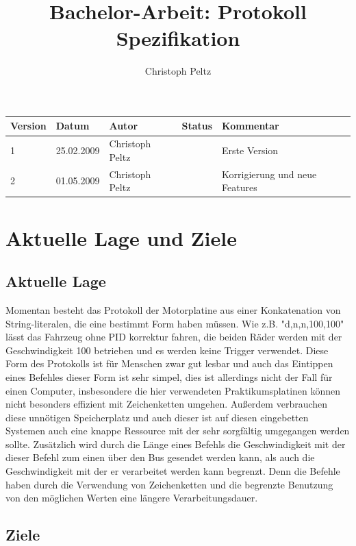 \documentclass[a4paper]{article}
\title{Bachelor-Arbeit: Protokoll Spezifikation}
\author{Christoph Peltz}
\begin{document}
\maketitle
\tableofcontents
	\begin{tabularx}{\linewidth}{|l|l|l|l|X|}
		\hline
		\textbf{Version} & \textbf{Datum} & \textbf{Autor} 	& \textbf{Status} & \textbf{Kommentar} \\
		\hline
		\hline
		1 				 & 25.02.2009 	  & Christoph Peltz & 				  & Erste Version \\
		2 				 & 01.05.2009 	  & Christoph Peltz & 				  & Korrigierung und neue Features \\
		\hline
	\end{tabularx}

\pagebreak
	\section{Aktuelle Lage und Ziele}

	\subsection{Aktuelle Lage}

	Momentan besteht das Protokoll der Motorplatine aus einer Konkatenation von String-literalen, die eine bestimmt Form haben müssen.
	Wie z.B. "d,n,n,100,100" lässt das Fahrzeug ohne PID korrektur fahren, die beiden Räder werden mit der Geschwindigkeit 100
	betrieben und es werden keine Trigger verwendet. Diese Form des Protokolls ist für Menschen zwar gut lesbar und auch das Eintippen
	eines Befehles dieser Form ist sehr simpel, dies ist allerdings nicht der Fall für einen Computer, insbesondere die hier
	verwendeten Praktikumsplatinen können nicht besonders effizient mit Zeichenketten umgehen. Außerdem verbrauchen diese unnötigen
	Speicherplatz und auch dieser ist auf diesen eingebetten Systemen auch eine knappe Ressource mit der sehr sorgfältig umgegangen
	werden sollte. Zusätzlich wird durch die Länge eines Befehls die Geschwindigkeit mit der dieser Befehl zum einen über den Bus
	gesendet werden kann, als auch die Geschwindigkeit mit der er verarbeitet werden kann begrenzt. Denn die Befehle haben durch
	die Verwendung von Zeichenketten und die begrenzte Benutzung von den möglichen Werten eine längere Verarbeitungsdauer.

	\subsection{Ziele}
\end{document}

